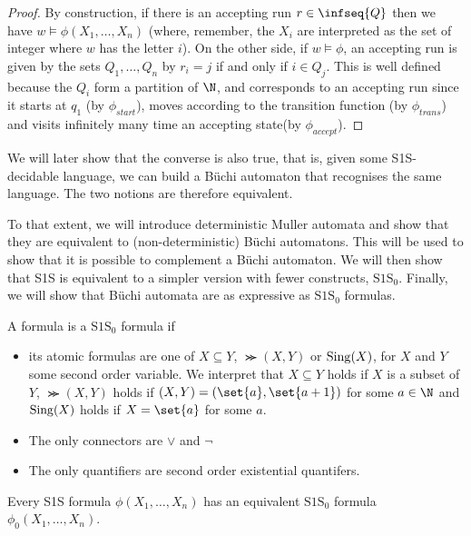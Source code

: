 \begin{proof}
    By construction, if there is an accepting run $r \in \infseq{Q}$
    then we have $w \models \phi(X_1, \dots, X_n)$ (where, remember, the $X_i$
    are interpreted as the set of integer where $w$ has the letter $i$).
    On the other side, if $w \models \phi$, an accepting run
    is given by the sets $Q_1, \dots, Q_{n}$ by $r_i = j$
    if and only if $i \in Q_j$. This is well defined because the $Q_i$
    form a partition of $\N$, and corresponds to an accepting run
    since it starts at $q_1$ (by $\phi_{start}$),
    moves according to the transition function (by $\phi_{trans}$)
    and visits infinitely many time an accepting state(by $\phi_{accept}$).
\end{proof}

We will later show that the converse is also true,
that is, given some S1S-decidable language,
we can build a Büchi automaton that recognises the same
language. The two notions are therefore equivalent.

To that extent, we will introduce deterministic Muller
automata and show that they are equivalent to (non-deterministic)
Büchi automatons. This will be used to show
that it is possible to complement a Büchi automaton.
We will then show that S1S is equivalent
to a simpler version with fewer constructs, $\text{S1S}_0$.
Finally, we will show that Büchi automata are as expressive
as $\text{S1S}_0$ formulas.


\begin{definition}
    A formula is a $\text{S1S}_0$ formula if
    \begin{itemize}
        \item its atomic formulas are one of $X \subseteq Y$,
            $\Succ(X, Y)$ or $\mathrm{Sing}(X)$, for $X$ and $Y$ some second
            order variable. We interpret that $X \subseteq Y$ holds
            if $X$ is a subset of $Y$, $\Succ(X, Y)$ holds if
            $(X, Y) = (\set{a}, \set{a+1})$ for some $a \in \N$ and
            $\mathrm{Sing}(X)$ holds if $X = \set{a}$ for some $a$.
        \item The only connectors are $\vee$ and $\neg$
        \item The only quantifiers are second order existential quantifers.
    \end{itemize}
\end{definition}

\begin{lemma}
    \label{lemma:s1s-is-s1s-0}
    Every S1S formula $\phi(X_1, \dots, X_n)$ has
    an equivalent $\text{S1S}_0$ formula $\phi_0(X_1, \dots, X_n)$.
\end{lemma}

